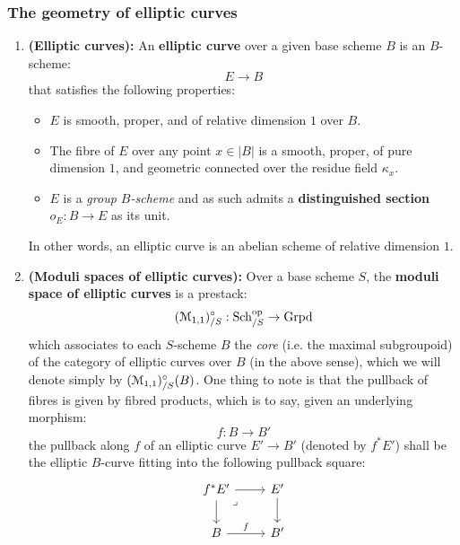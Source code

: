             \subsubsection{The geometry of elliptic curves}
                \begin{definition} \label{def: moduli_of_elliptic_curves} 
                    \noindent
                    \begin{enumerate}
                        \item \textbf{(Elliptic curves):} An \textbf{elliptic curve} over a given base scheme $B$ is an $B$-scheme:
                            $$E \to B$$
                        that satisfies the following properties:
                            \begin{itemize}
                                \item $E$ is smooth, proper, and of relative dimension $1$ over $B$.
                                \item The fibre of $E$ over any point $x \in |B|$ is a smooth, proper, of pure dimension $1$, and geometric connected over the residue field $\kappa_x$.
                                \item $E$ is a \textit{group $B$-scheme} and as such admits a \textbf{distinguished section} $o_E: B \to E$ as its unit.
                            \end{itemize}
                        In other words, an elliptic curve is an abelian scheme of relative dimension $1$.
                        \item \textbf{(Moduli spaces of elliptic curves):} Over a base scheme $S$, the \textbf{moduli space of elliptic curves} is a prestack:
                            $$(\mathcal{M}_{1, 1})_{/S}^{\circ}: \mathrm{Sch}_{/S}^{\mathrm{op}} \to \mathrm{Grpd}$$
                        which associates to each $S$-scheme $B$ the \textit{core} (i.e. the maximal subgroupoid) of the category of elliptic curves over $B$ (in the above sense), which we will denote simply by $(\mathcal{M}_{1, 1})_{/S}^{\circ}(B)$. One thing to note is that the pullback of fibres is given by fibred products, which is to say, given an underlying morphism:
                            $$f: B \to B'$$
                        the pullback along $f$ of an elliptic curve $E' \to B'$ (denoted by $f^*E'$) shall be the elliptic $B$-curve fitting into the following pullback square:
                            $$
                                \begin{tikzcd}
                                	{f^*E'} & {E'} \\
                                	B & {B'}
                                	\arrow[from=1-1, to=2-1]
                                	\arrow["f", from=2-1, to=2-2]
                                	\arrow[from=1-2, to=2-2]
                                	\arrow[from=1-1, to=1-2]
                                	\arrow["\lrcorner"{anchor=center, pos=0.125}, draw=none, from=1-1, to=2-2]
                                \end{tikzcd}
                            $$
                    \end{enumerate}
                \end{definition}
